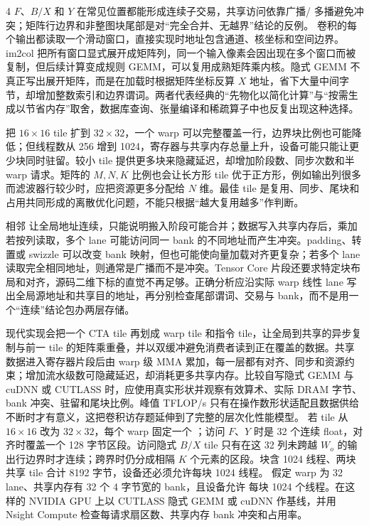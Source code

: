 \begin{solutionexercise}{4}
\conclusionheading $F$、$B/X$ 和 $Y$ 在常见位置都能形成连续子交易，共享访问依靠广播/
多播避免冲突；矩阵行边界和非整图块尾部是对“完全合并、无越界”结论的反例。
\discussionheading
{}
卷积的每个输出都读取一个滑动窗口，直接实现时地址包含通道、核坐标和空间边界。im2col 把所有窗口显式展开成矩阵列，同一个输入像素会因出现在多个窗口而被复制，但后续计算变成规则 GEMM，可以复用成熟矩阵乘内核。隐式 GEMM 不真正写出展开矩阵，而是在加载时根据矩阵坐标反算 $X$ 地址，省下大量中间字节，却增加整数索引和边界谓词。两者代表经典的“先物化以简化计算”与“按需生成以节省内存”取舍，数据库查询、张量编译和稀疏算子中也反复出现这种选择。

把 $16\times16$ tile 扩到 $32\times32$，一个 warp 可以完整覆盖一行，边界块比例也可能降低；但线程数从 256 增到 1024，寄存器与共享内存总量上升，设备可能只能让更少块同时驻留。较小 tile 提供更多块来隐藏延迟，却增加阶段数、同步次数和半 warp 请求。矩阵的 $M,N,K$ 比例也会让长方形 tile 优于正方形，例如输出列很多而滤波器行较少时，应把资源更多分配给 $N$ 维。最佳 tile 是复用、同步、尾块和占用共同形成的离散优化问题，不能只根据“越大复用越多”作判断。

相邻  让全局地址连续，只能说明搬入阶段可能合并；数据写入共享内存后，乘加若按列读取，多个 lane 可能访问同一 bank 的不同地址而产生冲突。padding、转置或 swizzle 可以改变 bank 映射，但也可能使向量加载对齐更复杂；若多个 lane 读取完全相同地址，则通常是广播而不是冲突。Tensor Core 片段还要求特定块布局和对齐，源码二维下标的直觉不再足够。正确分析应沿实际 warp 线性 lane 写出全局源地址和共享目的地址，再分别检查尾部谓词、交易与 bank，而不是用一个“连续”结论包办两层存储。

现代实现会把一个 CTA tile 再划成 warp tile 和指令 tile，让全局到共享的异步复制与前一 tile 的矩阵乘重叠，并以双缓冲避免消费者读到正在覆盖的数据。共享数据进入寄存器片段后由 warp 级 MMA 累加，每一层都有对齐、同步和资源约束；增加流水级数可隐藏延迟，却消耗更多共享内存。比较自写隐式 GEMM 与 cuDNN 或 CUTLASS 时，应使用真实形状并观察有效算术、实际 DRAM 字节、bank 冲突、驻留和尾块比例。峰值 TFLOP/s 只有在操作数形状适配且数据供给不断时才有意义，这把卷积访存题延伸到了完整的层次化性能模型。
\variantheading 若 tile 从 $16\times16$ 改为 $32\times32$，每个 warp 固定一个
；访问 $F$、$Y$ 时是 32 个连续 float，对齐时覆盖一个 128 字节区段。访问隐式
$B/X$ tile 只有在这 32 列未跨越 $W_o$ 的输出行边界时才连续；跨界时仍分成相隔 $K$
个元素的区段。块含 1024 线程、两块共享 tile 合计 8192 字节，设备还必须允许每块
1024 线程。
\practiceheading 假定 warp 为 32 lane、共享内存有 32 个 4 字节宽的 bank，且设备允许
每块 1024 个线程。在这样的 NVIDIA GPU 上以 CUTLASS 隐式 GEMM 或 cuDNN 作基线，并用
Nsight Compute 检查每请求扇区数、共享内存 bank 冲突和占用率。
\end{solutionexercise}
